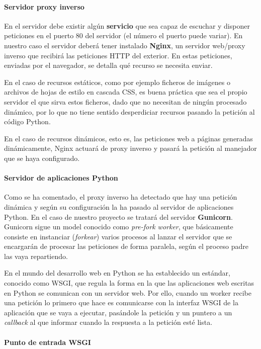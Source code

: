 \paragraph{Servidor proxy inverso}

En el servidor debe existir algún \textbf{servicio} que sea capaz de escuchar y
disponer peticiones en el puerto 80 del servidor (el número el puerto puede
variar). En nuestro caso el servidor deberá tener instalado \textbf{Nginx}, un
servidor web/proxy inverso que recibirá las peticiones HTTP del exterior. En
estas peticiones, enviadas por el navegador, se detalla qué recurso se necesita
enviar. 

En el caso de recursos estáticos, como por ejemplo ficheros de imágenes o
archivos de hojas de estilo en cascada \ac{CSS}, es buena práctica que sea el
propio servidor el que sirva estos ficheros, dado que no necesitan de ningún
procesado dinámico, por lo que no tiene sentido desperdiciar recursos pasando la
petición al código Python.

En el caso de recursos dinámicos, esto es, las peticiones web a páginas
generadas dinámicamente, Nginx actuará de proxy inverso y pasará la petición al
manejador que se haya configurado. 

\paragraph{Servidor de aplicaciones Python}

Como se ha comentado, el proxy inverso ha detectado que hay una petición
dinámica y según su configuración la ha pasado al servidor de aplicaciones
Python. En el caso de nuestro proyecto se tratará del servidor
\textbf{Gunicorn}. Gunicorn sigue un model conocido como \textit{pre-fork
  worker}, que básicamente consiste en instanciar (\textit{forkear}) varios
procesos al lanzar el servidor que se encargarán de procesar las peticiones de
forma paralela, según el proceso padre las vaya repartiendo.

En el mundo del desarrollo web en Python se ha establecido un estándar, conocido
como \ac{WSGI}, que regula la forma en la que las aplicaciones web escritas en
Python se comunican con un servidor web. Por ello, cuando un worker recibe una
petición lo primero que hace es comunicarse con la interfaz WSGI de la
aplicación que se vaya a ejecutar, pasándole la petición y un puntero a un
\textit{callback} al que informar cuando la respuesta a la petición esté
lista. 

\paragraph{Punto de entrada WSGI}

